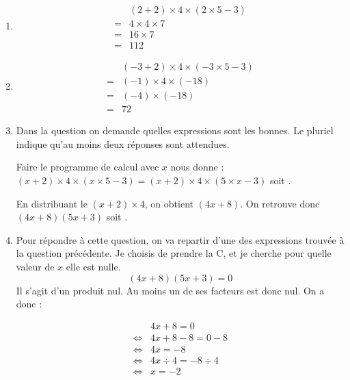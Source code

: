 \begin{enumerate}
        \item\noindent
        \begin{align*}
            &(2+2)\times 4 \times (2\times 5-3)\\
            =&4\times 4 \times7\\
            =&16\times 7\\
            =&112
        \end{align*}
        
        \item\noindent
        \begin{align*}
            &(-3+2)\times 4 \times (-3\times 5-3)\\
            =&(-1)\times 4 \times(-18)\\
            =&(-4)\times (-18)\\
            =&72
        \end{align*}

        \vspace*{1em}\item Dans la question on demande quelles expressions sont les bonnes. Le pluriel indique qu'au moins deux réponses sont attendues. 
        
        Faire le programme de calcul avec $x$ nous donne :
        $(x+2)\times 4 \times (x\times 5-3)=(x+2)\times 4 \times (5\times x-3)$ soit . 

        En distribuant le $(x+2)\times 4$, on obtient $(4x+8)$. On retrouve donc $(4x+8)(5x+3)$ soit .

        \vspace*{1em}\item Pour répondre à cette question, on va repartir d'une des expressions trouvée à la question précédente. Je choisis de prendre la C, et je cherche pour quelle valeur de $x$ elle est nulle.
        $$(4x+8)(5x+3)=0$$ Il s'agit d'un produit nul. Au moins un de ses facteurs est donc nul. On a donc :
        \begin{multicols}{2}
            \begin{align*}
                &4x+8=0\\
                \iff & 4x+8-8=0-8\\
                \iff & 4x=-8\\
                \iff & 4x\div 4=-8\div4\\
                \iff & x=-2
            \end{align*}


\end{multicols}
\end{enumerate}
